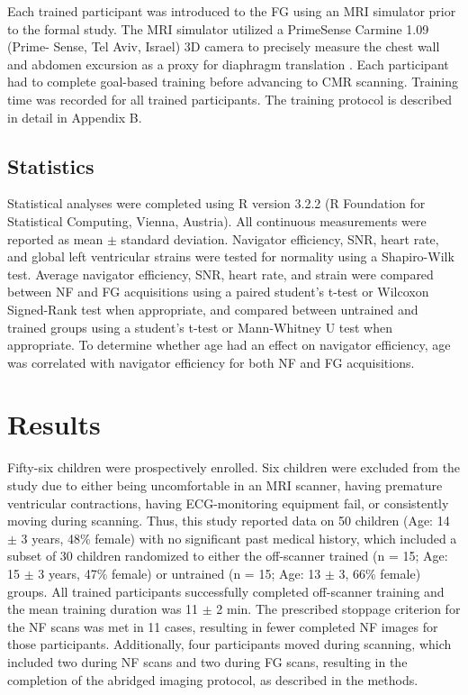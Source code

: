 	Each trained participant was introduced to the FG using	an MRI simulator prior to the formal study. The MRI simulator utilized a PrimeSense Carmine 1.09 (Prime- Sense, Tel Aviv, Israel) 3D camera to precisely measure the chest wall and abdomen excursion as a proxy for diaphragm translation \cite{Harte2016,Heß2015}. Each participant had to complete goal-based training before advancing to CMR scanning. Training time was recorded for all trained participants. The training protocol is described in detail in Appendix B.

\subsection{Statistics}
	Statistical analyses were completed using R version 3.2.2 (R Foundation for Statistical Computing, Vienna, Austria). All continuous measurements were reported as mean $\pm$ standard deviation. Navigator efficiency, SNR, heart rate, and global left ventricular strains were tested for normality using a Shapiro-Wilk test. Average navigator efficiency, SNR, heart rate, and strain were compared between NF and FG acquisitions using a paired student's t-test or Wilcoxon Signed-Rank test when appropriate, and compared between untrained and trained groups using a student's t-test or Mann-Whitney U test when appropriate. To determine whether age had an effect on navigator efficiency, age was correlated with navigator efficiency for both NF and FG acquisitions.
	
\section{Results}
	Fifty-six children were prospectively enrolled. Six children were excluded from the study due to either being uncomfortable in an MRI scanner, having premature ventricular contractions, having ECG-monitoring equipment fail, or consistently moving during scanning. Thus, this study reported data on 50 children (Age: 14 $\pm$ 3 years, 48\% female) with no significant past medical history, which included a subset of 30 children randomized to either the off-scanner trained (n = 15; Age: 15 $\pm$ 3 years, 47\% female) or untrained (n = 15; Age: 13 $\pm$ 3, 66\% female) groups. All trained participants successfully completed off-scanner training and the mean training duration was 11 $\pm$ 2 min. The prescribed stoppage criterion for the NF scans was met in 11 cases, resulting in fewer completed NF images for those participants. Additionally, four participants moved during scanning, which included two during NF scans and two during FG scans, resulting in the completion of the abridged imaging protocol, as described in the methods.

